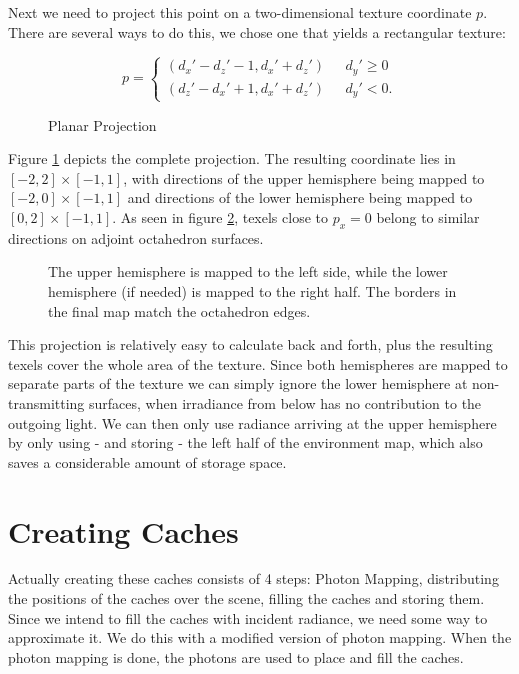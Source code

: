 Next we need to project this point on a two-dimensional texture coordinate $p$. There are several ways to do this, we chose one that yields a rectangular texture: 

\begin{equation}
p = \begin{cases}
  (d_x' - d_z' - 1, d_x' + d_z')  & \text{ } d_y' \geq 0 \\
  (d_z' - d_x'+ 1, d_x' + d_z') & \text{ } d_y' < 0.
\end{cases}
\label{planar_projection2}
\end{equation}

\begin{figure}[ht]
	\centering
\def\svgwidth{230pt}

	\caption{Planar Projection}
\label{texture_coord}\end{figure}



Figure \ref{texture_coord} depicts the complete projection. The resulting coordinate lies in $\left[-2,2\right]\times\left[-1,1\right]$, with directions of the upper hemisphere being mapped to $\left[-2,0\right]\times\left[-1,1\right]$ and directions of the lower hemisphere being mapped to $\left[0,2\right]\times\left[-1,1\right]$. As seen in figure \ref{octamap}, texels close to $p_x = 0$ belong to similar directions on adjoint octahedron surfaces. 

\begin{figure}[ht]
	\centering
	\def\svgwidth{230pt}
  
	\caption{The upper hemisphere is mapped to the left side, while the lower hemisphere (if needed) is mapped to the right half.\newline
The borders in the final map match the octahedron edges.}
	\label{octamap}\end{figure}


This projection is relatively easy to calculate back and forth, plus the resulting texels cover the whole area of the texture. Since both hemispheres are mapped to separate parts of the texture we can simply ignore the lower hemisphere at non-transmitting surfaces, when irradiance from below has no contribution to the outgoing light. We can then only use radiance arriving at the upper hemisphere by only using - and storing - the left half of the environment map, which also saves a considerable amount of storage space.

\section{Creating Caches}
Actually creating these caches consists of 4 steps: Photon Mapping, distributing the positions of the caches over the scene, filling the caches and storing them.\\
Since we intend to fill the caches with incident radiance, we need some way to approximate it. We do this with a modified version of photon mapping. When the photon mapping is done, the photons are used to place and fill the caches.



